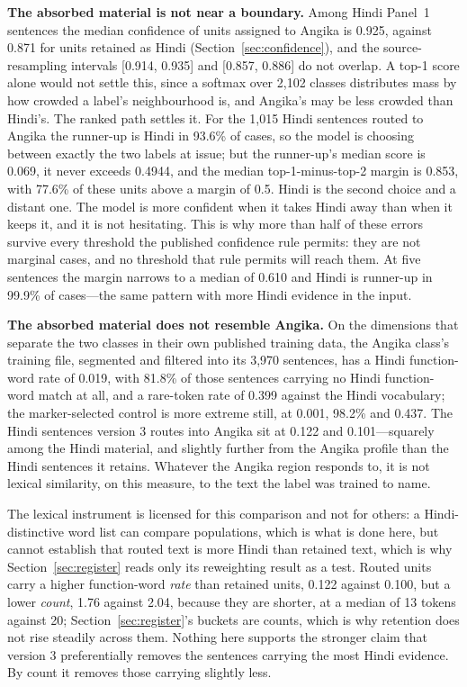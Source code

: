 \documentclass[final]{clv2025}
\begin{document}
\textbf{The absorbed material is not near a boundary.} Among Hindi Panel~1 sentences the median confidence of units assigned to Angika is 0.925, against 0.871 for units retained as Hindi (Section~\ref{sec:confidence}), and the source-resampling intervals [0.914, 0.935] and [0.857, 0.886] do not overlap. A top-1 score alone would not settle this, since a softmax over 2{,}102 classes distributes mass by how crowded a label's neighbourhood is, and Angika's may be less crowded than Hindi's. The ranked path settles it. For the 1{,}015 Hindi sentences routed to Angika the runner-up is Hindi in 93.6\% of cases, so the model is choosing between exactly the two labels at issue; but the runner-up's median score is 0.069, it never exceeds 0.4944, and the median top-1-minus-top-2 margin is 0.853, with 77.6\% of these units above a margin of 0.5. Hindi is the second choice and a distant one. The model is more confident when it takes Hindi away than when it keeps it, and it is not hesitating. This is why more than half of these errors survive every threshold the published confidence rule permits: they are not marginal cases, and no threshold that rule permits will reach them. At five sentences the margin narrows to a median of 0.610 and Hindi is runner-up in 99.9\% of cases---the same pattern with more Hindi evidence in the input.

\textbf{The absorbed material does not resemble Angika.} On the dimensions that separate the two classes in their own published training data, the Angika class's training file, segmented and filtered into its 3{,}970 sentences, has a Hindi function-word rate of 0.019, with 81.8\% of those sentences carrying no Hindi function-word match at all, and a rare-token rate of 0.399 against the Hindi vocabulary; the marker-selected control is more extreme still, at 0.001, 98.2\% and 0.437. The Hindi sentences version 3 routes into Angika sit at 0.122 and 0.101---squarely among the Hindi material, and slightly further from the Angika profile than the Hindi sentences it retains. Whatever the Angika region responds to, it is not lexical similarity, on this measure, to the text the label was trained to name.

The lexical instrument is licensed for this comparison and not for others: a Hindi-distinctive word list can compare populations, which is what is done here, but cannot establish that routed text is more Hindi than retained text, which is why Section~\ref{sec:register} reads only its reweighting result as a test. Routed units carry a higher function-word \emph{rate} than retained units, 0.122 against 0.100, but a lower \emph{count}, 1.76 against 2.04, because they are shorter, at a median of 13 tokens against 20; Section~\ref{sec:register}'s buckets are counts, which is why retention does not rise steadily across them. Nothing here supports the stronger claim that version 3 preferentially removes the sentences carrying the most Hindi evidence. By count it removes those carrying slightly less.
\end{document}
